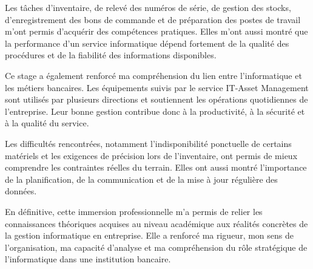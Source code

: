 \documentclass[12pt,a4paper]{report}
\begin{document}
Les tâches d'inventaire, de relevé des numéros de série, de gestion des stocks, d'enregistrement des bons de commande et de préparation des postes de travail m'ont permis d'acquérir des compétences pratiques. Elles m'ont aussi montré que la performance d'un service informatique dépend fortement de la qualité des procédures et de la fiabilité des informations disponibles.

Ce stage a également renforcé ma compréhension du lien entre l'informatique et les métiers bancaires. Les équipements suivis par le service IT-Asset Management sont utilisés par plusieurs directions et soutiennent les opérations quotidiennes de l'entreprise. Leur bonne gestion contribue donc à la productivité, à la sécurité et à la qualité du service.

Les difficultés rencontrées, notamment l'indisponibilité ponctuelle de certains matériels et les exigences de précision lors de l'inventaire, ont permis de mieux comprendre les contraintes réelles du terrain. Elles ont aussi montré l'importance de la planification, de la communication et de la mise à jour régulière des données.

En définitive, cette immersion professionnelle m'a permis de relier les connaissances théoriques acquises au niveau académique aux réalités concrètes de la gestion informatique en entreprise. Elle a renforcé ma rigueur, mon sens de l'organisation, ma capacité d'analyse et ma compréhension du rôle stratégique de l'informatique dans une institution bancaire.
\end{document}
